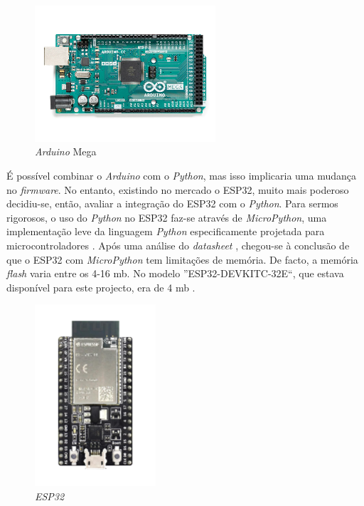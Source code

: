\begin{figure}[hbtp]
    \centering
    \includegraphics[width=0.6\textwidth]{figures/arduinomega.png}
    \caption{\textit{Arduino} Mega \cite{ArduinoMega}}
    \label{fig:arduinomega}
\end{figure}

É possível combinar o \textit{Arduino} com o \textit{Python}, mas isso implicaria uma mudança no \textit{firmware}. No entanto, existindo no mercado o \gls{ESP32}, muito mais poderoso decidiu-se, então, avaliar a integração do \gls{ESP32} com o \textit{Python}. Para sermos rigorosos, o uso do \textit{Python} no \gls{ESP32} faz-se através de \textit{MicroPython}, uma implementação leve da linguagem \textit{Python} especificamente projetada para microcontroladores \cite{micropythonesp32}\cite{MicroPythonlib}.
Após uma análise do \textit{datasheet} \cite{esp32datasheet}, chegou-se à conclusão de que o \gls{ESP32} com \textit{MicroPython} tem limitações de memória. De facto, a memória \textit{flash} varia entre os 4-16 \acrlong{mb}. No modelo ''ESP32-DEVKITC-32E``, que estava disponível para este projecto, era de 4 \acrshort{mb} \cite{diferencaspython}. 

\begin{figure}[hbtp]
    \centering
    \includegraphics[width=0.4\textwidth]{figures/ESP32-DevKitC_L_0.png}
    \caption{\textit{ESP32} \cite{ESPDevKit}}
    \label{fig:ESP32}
\end{figure}

